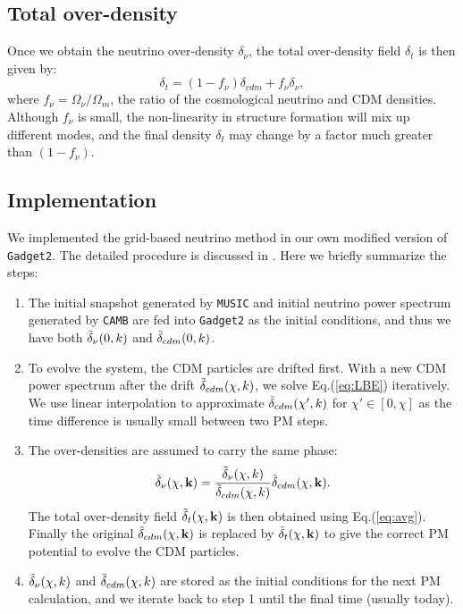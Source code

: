 \subsection{Total over-density}
Once we obtain the neutrino over-density $\delta_\nu$, the total over-density field $\delta_t$ is then given by:
\begin{equation}
\label{eq:avg}
    \delta_t = (1-f_\nu)\delta_{cdm} + f_\nu \delta_\nu,
\end{equation}
where $f_\nu=\Omega_\nu / \Omega_m$, the ratio of the cosmological neutrino and CDM densities. Although $f_\nu$ is small, the non-linearity in structure formation will mix up different modes, and the final density $\delta_t $ may change by a factor much greater than $(1- f_\nu)$.

\subsection{Implementation}
We implemented the grid-based neutrino method in our own modified version of \texttt{Gadget2}. The detailed procedure is discussed in \cite{Carton}. Here we briefly summarize the steps:

\begin{enumerate}
    \item The initial snapshot generated by \texttt{MUSIC} \cite{music} and initial neutrino power spectrum generated by \texttt{CAMB} are fed into \texttt{Gadget2} as the initial conditions, and thus we have both $\Tilde{\delta}_\nu(0,k)$ and $\Tilde{\delta}_{cdm}(0,k)$.
    
    \item To evolve the system, the CDM particles are drifted first. With a new CDM power spectrum after the drift $\Tilde{\delta}_{cdm}(\chi, k)$, we solve Eq.(\ref{eq:LBE}) iteratively. We use linear interpolation to approximate $\Tilde{\delta}_{cdm}(\chi', k)$ for $\chi' \in [0,\chi]$ as the time difference is usually small between two PM steps.
    
    \item The over-densities are assumed to carry the same phase:
    \begin{equation}
        \Tilde{\delta}_\nu (\chi, {\bf k}) = \frac{\Tilde{\delta}_\nu(\chi, k)}{\Tilde{\delta}_{cdm}(\chi, k)} \Tilde{\delta}_{cdm}(\chi, {\bf k}).
    \end{equation}
    The total over-density field $\Tilde{\delta}_t(\chi, {\bf k})$ is then obtained using Eq.(\ref{eq:avg}). Finally the original $\Tilde{\delta}_{cdm}(\chi, {\bf k})$ is replaced by $\Tilde{\delta}_t(\chi, {\bf k})$ to give the correct PM potential to evolve the CDM particles.
    
    \item $\Tilde{\delta}_\nu(\chi, k)$ and $\Tilde{\delta}_{cdm}(\chi, k)$ are stored as the initial conditions for the next PM calculation, and we iterate back to step 1 until the final time (usually today).
    
\end{enumerate}

